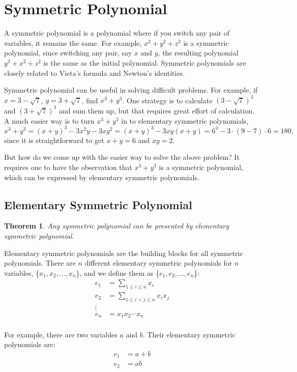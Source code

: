 \documentclass[11pt, oneside]{article}   	%
\newtheorem{theorem}{Theorem}
\begin{document}
\newpage
\section{Symmetric Polynomial}
A symmetric polynomial is a polynomial where if you switch any pair of variables, it remains the same. For example, $x^2+y^2+z^2$ is a symmetric polynomial, since switching any pair, say $x$ and $y$, the resulting polynomial $y^2+x^2+z^2$ is the same as the initial polynomial. Symmetric polynomials are closely related to Vieta's formula and Newton's identities. 

Symmetric polynomial can be useful in solving difficult problems. For example, if $x=3-\sqrt{7}$, $y=3+\sqrt{7}$, find $x^3+y^3$. One strategy is to calculate $(3-\sqrt{7})^3$ and $(3+\sqrt{7})^3$ and sum them up, but that requires great effort of calculation. A much easier way is to turn $x^3+y^3$ in to elementary symmetric polynomials, 
\[x^3+y^3 = (x+y)^3 - 3x^2y - 3xy^2 = (x+y)^3 - 3xy(x+y) = 6^3-3\cdot (9-7)\cdot 6 = 180, \] 
since it is straightforward to get $x+y=6$ and $xy=2$. 

But how do we come up with the easier way to solve the above problem? It requires one to have the observation that $x^3+y^3$ is a symmetric polynomial, which can be expressed by elementary symmetric polynomials.   


\subsection{Elementary Symmetric Polynomial}
\begin{theorem}
Any symmetric polynomial can be presented by elementary symmetric polynomial. 
\end{theorem}

Elementary symmetric polynomials are the building blocks for all symmetric polynomials. There are $n$ different elementary symmetric polynomials for $n$ variables, \{$x_1,x_2,\dots ,x_n$\}, and we define them as \{$e_1, e_2, \dots ,e_n$\}: 
\begin{align*}
e_1 &=\sum_{1\le i\le n} x_i\\
e_2 &=\sum_{1\le i< j\le n} x_i x_j\\
\vdots\\
e_n &=x_1 x_2 \cdots x_n\\
\end{align*}
 
For example, there are two variables $a$ and $b$. Their elementary symmetric polynomials are: 
\begin{align*}
e_1 &=a+b\\
e_2 &=ab\\
\end{align*}
\end{document}
